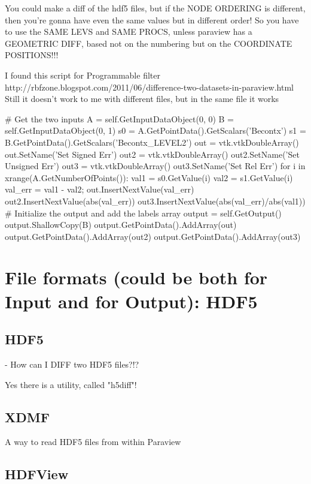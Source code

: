 \documentclass[10pt]{book}
\begin{document}
You could make a diff of the hdf5 files, but if the NODE ORDERING 
is different, then you're gonna have even the same values but in 
different order!
So you have to use the SAME LEVS and SAME PROCS,
unless paraview has a GEOMETRIC DIFF, based not on the numbering 
but on the COORDINATE POSITIONS!!!

I found this script for Programmable filter
http://rbfzone.blogspot.com/2011/06/difference-two-datasets-in-paraview.html
Still it doesn't work to me with different files, but in the same file it works


\# Get the two inputs
A = self.GetInputDataObject(0, 0)
B = self.GetInputDataObject(0, 1)
s0 = A.GetPointData().GetScalars('Becontx')
s1 = B.GetPointData().GetScalars('Becontx\_LEVEL2')
out = vtk.vtkDoubleArray()
out.SetName('Set Signed Err')
out2 = vtk.vtkDoubleArray()
out2.SetName('Set Unsigned Err')
out3 = vtk.vtkDoubleArray()
out3.SetName('Set Rel Err')
for i in xrange(A.GetNumberOfPoints()):
    val1 = s0.GetValue(i)
    val2 = s1.GetValue(i)
    val\_err = val1 - val2;
    out.InsertNextValue(val\_err)
    out2.InsertNextValue(abs(val\_err))
    out3.InsertNextValue(abs(val\_err)/abs(val1))
\# Initialize the output and add the labels array
output = self.GetOutput()
output.ShallowCopy(B)
output.GetPointData().AddArray(out)
output.GetPointData().AddArray(out2)
output.GetPointData().AddArray(out3)



 \part{File formats (could be both for Input and for Output): HDF5}
 
 \chapter{HDF5} 
 
  - How can I DIFF two HDF5 files?!?

   Yes there is a utility, called "h5diff"! 
   

 \chapter{XDMF}
 
 A way to read HDF5 files from within Paraview

 \chapter{HDFView}
 
\end{document}
